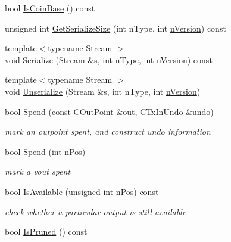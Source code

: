 \begin{DoxyCompactItemize}
\item 
bool \hyperlink{class_c_coins_a5dda8b622fd4ebd48d382ea6be0db3c6}{Is\+Coin\+Base} () const 
\item 
unsigned int \hyperlink{class_c_coins_a74ddd9230570c084ea56feaf4b9d7e06}{Get\+Serialize\+Size} (int n\+Type, int \hyperlink{class_c_coins_a96fea4ee8841e9ce32f60c2e7e3cf6b6}{n\+Version}) const 
\item 
{\footnotesize template$<$typename Stream $>$ }\\void \hyperlink{class_c_coins_a0932a94966083092cbceabec1ef65d73}{Serialize} (Stream \&s, int n\+Type, int \hyperlink{class_c_coins_a96fea4ee8841e9ce32f60c2e7e3cf6b6}{n\+Version}) const 
\item 
{\footnotesize template$<$typename Stream $>$ }\\void \hyperlink{class_c_coins_adaa98cb6d8da3a4d573cd799ddd11051}{Unserialize} (Stream \&s, int n\+Type, int \hyperlink{class_c_coins_a96fea4ee8841e9ce32f60c2e7e3cf6b6}{n\+Version})
\item 
bool \hyperlink{class_c_coins_a8d5fe8c1ab0c9558620448a19ecdb8b2}{Spend} (const \hyperlink{class_c_out_point}{C\+Out\+Point} \&out, \hyperlink{class_c_tx_in_undo}{C\+Tx\+In\+Undo} \&undo)
\begin{DoxyCompactList}\small\item\em mark an outpoint spent, and construct undo information \end{DoxyCompactList}\item 
bool \hyperlink{class_c_coins_a99210076cac4b1ac521a532d3b5df182}{Spend} (int n\+Pos)
\begin{DoxyCompactList}\small\item\em mark a vout spent \end{DoxyCompactList}\item 
bool \hyperlink{class_c_coins_a69bdcbac02e1644cb02b2645068777b5}{Is\+Available} (unsigned int n\+Pos) const 
\begin{DoxyCompactList}\small\item\em check whether a particular output is still available \end{DoxyCompactList}\item 
bool \hyperlink{class_c_coins_af28a2e44f0b41c3a4a6366607b4b8f81}{Is\+Pruned} () const 
\end{DoxyCompactItemize}

